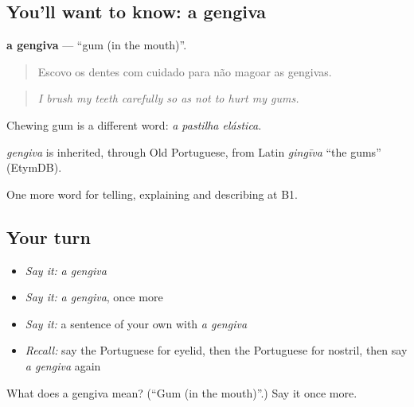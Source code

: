 \subsection*{You'll want to know: a gengiva}
\textbf{a gengiva} — \textquotedblleft{}gum (in the mouth)\textquotedblright{}.

\begin{quote}
Escovo os dentes com cuidado para não magoar as gengivas.
\end{quote}

\begin{quote}
\emph{I brush my teeth carefully so as not to hurt my gums.}
\end{quote}

Chewing gum is a different word: \emph{a pastilha elástica}.

\begin{cousinweb}
\emph{gengiva} is inherited, through Old Portuguese, from Latin \emph{gingīva} \textquotedblleft{}the gums\textquotedblright{} (EtymDB).
\end{cousinweb}

\begin{grammarlens}[title={What you've built}]
One more word for telling, explaining and describing at B1.
\end{grammarlens}

\subsection*{Your turn}
\begin{itemize}
\raggedright
  \item \emph{Say it:} \emph{a gengiva}
  \item \emph{Say it:} \emph{a gengiva}, once more
  \item \emph{Say it:} a sentence of your own with \emph{a gengiva}
  \item \emph{Recall:} say the Portuguese for eyelid, then the Portuguese for nostril, then say \emph{a gengiva} again
\end{itemize}

\begin{tcolorbox}[breakable,colback=teal!4,colframe=teal!35!black,title={Before you move on}]
What does a gengiva mean? (\textquotedblleft{}Gum (in the mouth)\textquotedblright{}.) Say it once more.
\end{tcolorbox}
